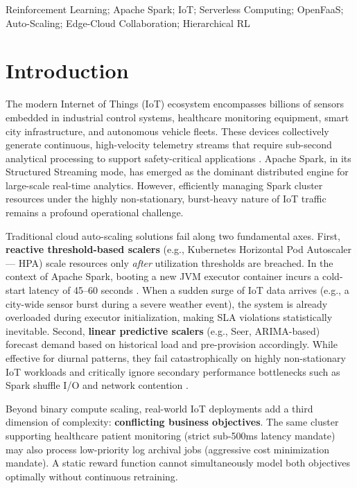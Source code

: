 \documentclass[10pt, conference, compsocconf]{IEEEtran}
\begin{document}
\begin{IEEEkeywords}
Reinforcement Learning; Apache Spark; IoT; Serverless Computing; OpenFaaS; Auto-Scaling; Edge-Cloud Collaboration; Hierarchical RL
\end{IEEEkeywords}

\IEEEpeerreviewmaketitle

\section{Introduction}

The modern Internet of Things (IoT) ecosystem encompasses billions of sensors embedded in industrial control systems, healthcare monitoring equipment, smart city infrastructure, and autonomous vehicle fleets. These devices collectively generate continuous, high-velocity telemetry streams that require sub-second analytical processing to support safety-critical applications \cite{chen2021edge}. Apache Spark, in its Structured Streaming mode, has emerged as the dominant distributed engine for large-scale real-time analytics. However, efficiently managing Spark cluster resources under the highly non-stationary, burst-heavy nature of IoT traffic remains a profound operational challenge.

Traditional cloud auto-scaling solutions fail along two fundamental axes. First, \textbf{reactive threshold-based scalers} (e.g., Kubernetes Horizontal Pod Autoscaler --- HPA) scale resources only \textit{after} utilization thresholds are breached. In the context of Apache Spark, booting a new JVM executor container incurs a cold-start latency of 45--60 seconds \cite{eismann2021serverless}. When a sudden surge of IoT data arrives (e.g., a city-wide sensor burst during a severe weather event), the system is already overloaded during executor initialization, making SLA violations statistically inevitable. Second, \textbf{linear predictive scalers} (e.g., Seer, ARIMA-based) forecast demand based on historical load and pre-provision accordingly. While effective for diurnal patterns, they fail catastrophically on highly non-stationary IoT workloads \cite{nestorov2024dexter} and critically ignore secondary performance bottlenecks such as Spark shuffle I/O and network contention \cite{pu2019shuffling}.

Beyond binary compute scaling, real-world IoT deployments add a third dimension of complexity: \textbf{conflicting business objectives}. The same cluster supporting healthcare patient monitoring (strict sub-500ms latency mandate) may also process low-priority log archival jobs (aggressive cost minimization mandate). A static reward function cannot simultaneously model both objectives optimally without continuous retraining.
\end{document}
